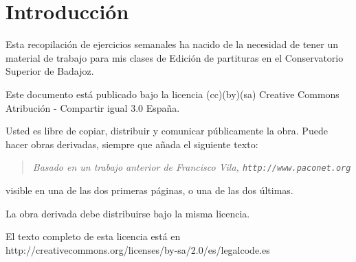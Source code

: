 \section*{Introducción}

Esta recopilación de ejercicios semanales ha nacido de la necesidad de
tener un material de trabajo para mis clases de Edición de partituras
en el Conservatorio Superior de Badajoz.

Este documento está publicado bajo la licencia (cc)(by)(sa) Creative
Commons Atribución - Compartir igual 3.0 España.

Usted es libre de copiar, distribuir y comunicar públicamente la obra.
Puede hacer obras derivadas, siempre que añada el siguiente texto:

\begin{quote}
\emph{Basado en un trabajo anterior de Francisco Vila,
  \texttt{http://www.paconet.org} }
\end{quote}

visible en una de las dos primeras páginas, o una de las dos últimas.

La obra derivada debe distribuirse bajo la misma licencia.

El texto completo de esta licencia está en
http://creativecommons.org/licenses/by-sa/2.0/es/legalcode.es
